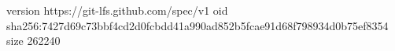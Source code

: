version https://git-lfs.github.com/spec/v1
oid sha256:7427d69c73bbf4cd2d0fcbdd41a990ad852b5fcae91d68f798934d0b75ef8354
size 262240
